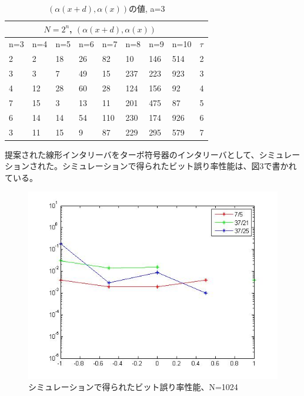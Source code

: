 \documentclass[20 pts]{article}
\begin{document}
\begin{table}[h!]
\centering
\begin{tabular}{ |p{0.7cm}|p{0.7cm}|p{0.7cm}|p{0.7cm}|p{0.7cm}|p{0.7cm}|p{0.7cm} |p{0.7cm}||p{0.7cm} |}
 \hline
 \multicolumn{8}{|c|}{$N=2^n$, $(\alpha(x+d),\alpha(x))$} \\
 \hline
n=3&n=4&n=5&n=6&n=7&n=8&n=9&n=10&$\tau$\\
 \hline
  
   2  &   2  &  18   & 26   & 82  &  10 &  146 &  514  &   2\\
   3 &    3  &   7  &  49  &  15 &  237 &  223 &  923 &    3\\
   4  &  12  &  28 &   60 &   28&   124 &  156 &   92  &   4\\
   7  &  15 &    3 &   13  &  11 &  201 &  475 &   87  &   5\\
   6   & 14   & 14  &  54 &  110 &  230 &  174 &  926 &    6\\
   3  &  11   & 15  &   9  &  87  & 229  & 295 &  579   &  7\\

 \hline
\end{tabular}
\caption{ $(\alpha(x+d),\alpha(x))$の値, a=3}
\label{table:3}
\end{table}
提案された線形インタリーバをターボ符号器のインタリーバとして、シミュレーションされた。シミュレーションで得られたビット誤り率性能は、図3で書かれている。

\begin{figure}[h!]
\includegraphics[width=\textwidth]{myLinearInterleaver.jpg}
\caption{シミュレーションで得られたビット誤り率性能、N=1024}
\label{}
\end{figure}
\end{document}
